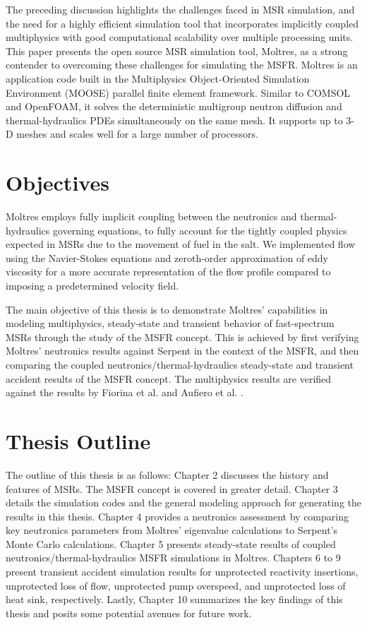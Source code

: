 The preceding discussion highlights the challenges faced in MSR simulation,
and the need for a highly efficient simulation tool that incorporates
implicitly coupled multiphysics with good computational scalability over
multiple processing units. This paper presents the open source MSR simulation
tool, Moltres, as a strong contender to overcoming these challenges for
simulating the MSFR. Moltres is an application code
built in the Multiphysics Object-Oriented Simulation Environment (MOOSE)
parallel finite element framework. Similar to COMSOL and OpenFOAM, it solves
the deterministic multigroup neutron diffusion and thermal-hydraulics
\glspl{PDE} simultaneously on the same mesh. It supports up to 3-D meshes and
scales well for a large number of processors.

\section{Objectives}

Moltres employs fully implicit coupling between the neutronics and
thermal-hydraulics governing equations, to fully account for the tightly
coupled physics expected in MSRs due to the movement of fuel in the salt. We
implemented flow using the Navier-Stokes equations and zeroth-order
approximation of eddy viscosity for a more accurate representation of the flow
profile compared to imposing a predetermined velocity field.

The main objective of this thesis is to demonstrate Moltres' capabilities in
modeling multiphysics, steady-state and transient behavior of fast-spectrum
\glspl{MSR} through the study of the \gls{MSFR} concept. This is achieved by
first verifying Moltres' neutronics results against Serpent in the context of
the \gls{MSFR}, and then comparing the coupled neutronics/thermal-hydraulics
steady-state and transient accident results of the \gls{MSFR} concept. The
multiphysics results are verified against the results by Fiorina et al.
\cite{fiorina_modelling_2014} and Aufiero et al.
\cite{aufiero_development_2014}.

\section{Thesis Outline}

The outline of this thesis is as follows: Chapter 2 discusses the history and
features of \glspl{MSR}. The \gls{MSFR} concept is covered in greater detail.
Chapter 3 details the simulation codes and the general modeling approach for
generating the results in this thesis. Chapter 4 provides a neutronics
assessment by comparing key neutronics parameters from Moltres' eigenvalue
calculations to Serpent's Monte Carlo calculations. Chapter 5 presents
steady-state results of coupled neutronics/thermal-hydraulics \gls{MSFR}
simulations in Moltres. Chapters 6 to 9 present transient accident simulation
results for unprotected reactivity insertions, unprotected loss of flow,
unprotected pump overspeed, and unprotected loss of heat sink, respectively.
Lastly, Chapter 10 summarizes the key findings of this thesis and posits some
potential avenues for future work.
